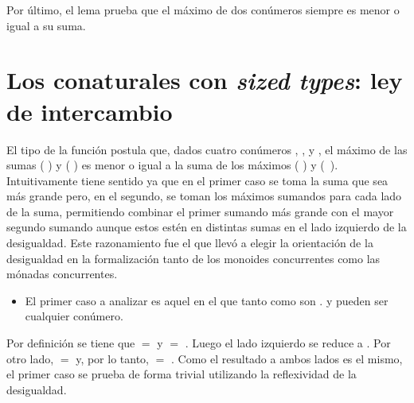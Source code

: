 Por último, el lema  prueba que el máximo de dos conúmeros siempre es menor o igual a su suma.

\section{Los conaturales con \textit{sized types}: ley de intercambio}\label{apendice:interchange}

\begin{AgdaAlign}
El tipo de la función  postula que, dados cuatro conúmeros , ,  y , el máximo de las sumas ( \AgdaFunction{+} ) y ( \AgdaFunction{+} ) es menor o igual a la suma de los máximos (  ) y \hbox{(  )}. Intuitivamente tiene sentido ya que en el primer caso se toma la suma que sea más grande pero, en el segundo, se toman los máximos sumandos para cada lado de la suma, permitiendo combinar el primer sumando más grande con el mayor segundo sumando aunque estos estén en distintas sumas en el lado izquierdo de la desigualdad. Este razonamiento fue el que llevó a elegir la orientación de la desigualdad en la formalización tanto de los monoides concurrentes como las mónadas concurrentes. 

\begin{itemize}
\item El primer caso a analizar es aquel en el que tanto  como 
 son .  y  pueden ser cualquier conúmero.
\end{itemize}

Por definición se tiene que  \AgdaFunction{+}  $=$  y  \AgdaFunction{+}  $=$ . Luego el lado izquierdo se reduce a   . Por otro lado,    $=$  y, por lo tanto,    \AgdaFunction{+}   $=$  . Como el resultado a ambos lados es el mismo, el primer caso se prueba de forma trivial utilizando la reflexividad de la desigualdad.


\end{AgdaAlign}
